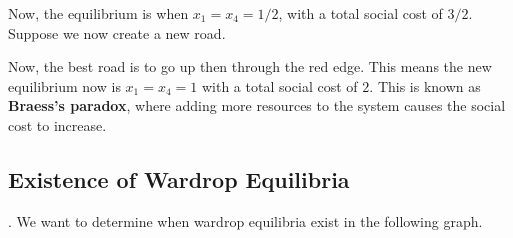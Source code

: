 Now, the equilibrium is when $x_1=x_4=1/2$, with a total social cost of $3/2$.
    Suppose we now create a new road.

    \begin{center}
        \end{center}

Now, the best road is to go up then through the red edge. This means the new equilibrium now is $x_1=x_4=1$ with a total social cost of $2$. This is known as \textbf{Braess's paradox}, where adding more resources to the system causes the social cost to increase.

\subsection*{Existence of Wardrop Equilibria}.
We want to determine when wardrop equilibria exist in the following graph.

